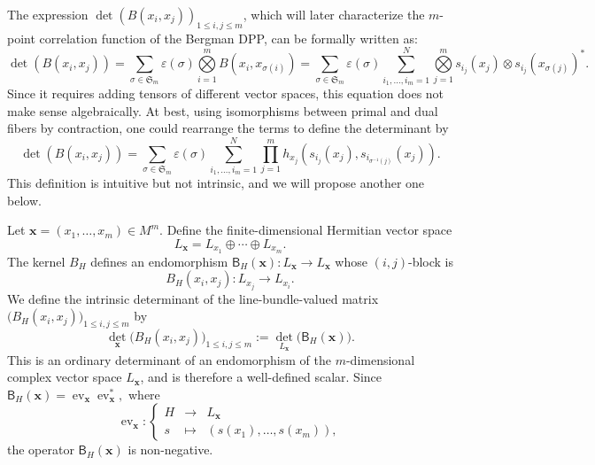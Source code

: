 \documentclass[12pt,a4paper,reqno]{article}
\theoremstyle{thmstyleone}
\theoremstyle{thmstylethree}
\theoremstyle{thmstyletwo}
\numberwithin{equation}{subsection}
\def\geq{\geqslant}
\def\leq{\leqslant}
\begin{document}
The expression $\det(B(x_i,x_j))_{1\leq i,j\leq m}$, which will later characterize the $m$-point correlation function of the Bergman DPP, can be formally written as:
\begin{equation}\label{eq:Bergman_det_section}
{\det}(B(x_i,x_j))=\sum_{\sigma\in\mathfrak{S}_m}\varepsilon(\sigma)\bigotimes\limits_{i=1}^m B(x_i,x_{\sigma(i)})=\sum_{\sigma\in\mathfrak{S}_m}\varepsilon(\sigma)\sum_{i_1,\ldots,i_m=1}^N\bigotimes\limits_{j=1}^m s_{i_j}(x_j)\otimes s_{i_j}(x_{\sigma(j)})^*.\nonumber
\end{equation}
Since it requires adding tensors of different vector spaces, this equation does not make sense algebraically. At best, using isomorphisms between primal and dual fibers by contraction, one could rearrange the terms to define the determinant by
\begin{equation}\label{eq:Bergman_det_function}
{\det}(B(x_i,x_j))=\sum_{\sigma\in\mathfrak{S}_m}\varepsilon(\sigma)\sum_{i_1,\ldots,i_m=1}^N\prod\limits_{j=1}^m h_{x_j}(s_{i_j}(x_j),s_{i_{\sigma^{-1}(j)}}(x_j)).
\end{equation}
This definition is intuitive but not intrinsic, and we will propose another one below.

Let $\mathbf x=(x_1,\ldots,x_m)\in M^m$. Define the finite-dimensional Hermitian vector space
\[
    L_{\mathbf x}
    =
    L_{x_1}\oplus\cdots\oplus L_{x_m}.
\]
The kernel $B_H$ defines an endomorphism $\mathsf B_H(\mathbf x):L_{\mathbf x}\longrightarrow L_{\mathbf x}$ whose $(i,j)$-block is
\[
    B_H(x_i,x_j):L_{x_j}\longrightarrow L_{x_i}.
\]
We define the intrinsic determinant of the line-bundle-valued matrix
$\big(B_H(x_i,x_j)\big)_{1\leq i,j\leq m}$ by
\begin{equation}\label{eq:intrinsic-det}
\det_{\mathbf x}\big(B_H(x_i,x_j)\big)_{1\leq i,j\leq m}:=    \det_{L_{\mathbf x}}\big(\mathsf B_H(\mathbf x)\big).
\end{equation}
This is an ordinary determinant of an endomorphism of the $m$-dimensional complex vector space $L_{\mathbf x}$, and is therefore a well-defined scalar. Since $\mathsf B_H(\mathbf x)=\operatorname{ev}_{\mathbf x}\operatorname{ev}_{\mathbf x}^*,$ where
\[
\operatorname{ev}_{\mathbf x}:\left\lbrace
\begin{array}{lll}
H & \longrightarrow & L_{\mathbf x}\\
s & \longmapsto &  (s(x_1),\ldots,s(x_m)),
\end{array}
\right.
\]
the operator $\mathsf B_H(\mathbf x)$ is non-negative.
\end{document}
